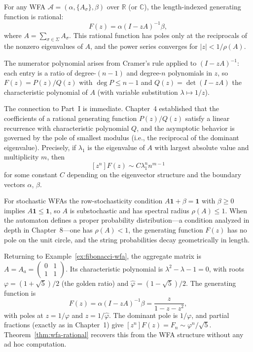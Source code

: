\begin{theorem}\label{thm:wfa-rational}
For any WFA $\mathcal{A} = (\alpha, \{A_\sigma\}, \beta)$ over $\mathbb{R}$ (or $\mathbb{C}$), the length-indexed generating function is rational:
\[
  F(z) = \alpha (I - zA)^{-1} \beta,
\]
where $A = \sum_{\sigma \in \Sigma} A_\sigma$. This rational function has poles only at the reciprocals of the nonzero eigenvalues of $A$, and the power series converges for $|z| < 1/\rho(A)$.
\end{theorem}

The numerator polynomial arises from Cramer's rule applied to $(I - zA)^{-1}$: each entry is a ratio of degree-$(n-1)$ and degree-$n$ polynomials in $z$, so $F(z) = P(z)/Q(z)$ with $\deg P \le n-1$ and $Q(z) = \det(I - zA)$ the characteristic polynomial of $A$ (with variable substitution $\lambda \mapsto 1/z$).

The connection to Part~I is immediate. Chapter~4 established that the coefficients of a rational generating function $P(z)/Q(z)$ satisfy a linear recurrence with characteristic polynomial $Q$, and the asymptotic behavior is governed by the pole of smallest modulus (i.e., the reciprocal of the dominant eigenvalue). Precisely, if $\lambda_1$ is the eigenvalue of $A$ with largest absolute value and multiplicity $m$, then
\[
  [z^n] F(z) \sim C \lambda_1^n n^{m-1}
\]
for some constant $C$ depending on the eigenvector structure and the boundary vectors $\alpha$, $\beta$.

For stochastic WFAs the row-stochasticity condition $A\mathbf{1} + \beta = \mathbf{1}$ with $\beta \ge 0$ implies $A\mathbf{1} \le \mathbf{1}$, so $A$ is substochastic and has spectral radius $\rho(A) \le 1$. When the automaton defines a proper probability distribution---a condition analyzed in depth in Chapter~8---one has $\rho(A) < 1$, the generating function $F(z)$ has no pole on the unit circle, and the string probabilities decay geometrically in length.

\begin{example}
Returning to Example~\ref{ex:fibonacci-wfa}, the aggregate matrix is $A = A_a = \begin{pmatrix}0&1\\1&1\end{pmatrix}$. Its characteristic polynomial is $\lambda^2 - \lambda - 1 = 0$, with roots $\varphi = (1+\sqrt{5})/2$ (the golden ratio) and $\hat\varphi = (1-\sqrt{5})/2$. The generating function is
\[
  F(z) = \alpha(I - zA)^{-1}\beta = \frac{z}{1 - z - z^2},
\]
with poles at $z = 1/\varphi$ and $z = 1/\hat\varphi$. The dominant pole is $1/\varphi$, and partial fractions (exactly as in Chapter~1) give $[z^n]F(z) = F_n \sim \varphi^n/\sqrt{5}$. Theorem~\ref{thm:wfa-rational} recovers this from the WFA structure without any ad hoc computation.
\end{example}

